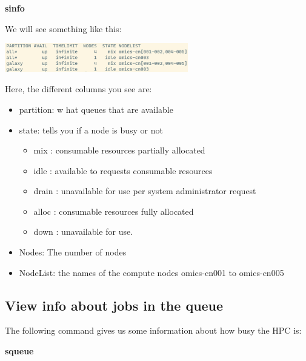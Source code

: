 \documentclass[
  letterpaper,
  DIV=11,
  numbers=noendperiod]{scrreprt}
\newenvironment{Shaded}{}{}
\newcommand{\ExtensionTok}[1]{\textcolor[rgb]{0.84,0.23,0.29}{\textbf{#1}}}
\providecommand{\tightlist}{%
  \setlength{\itemsep}{0pt}\setlength{\parskip}{0pt}}\usepackage{longtable,booktabs,array}
\begin{document}
\begin{Shaded}
\begin{Highlighting}[]
\ExtensionTok{sinfo}
\end{Highlighting}
\end{Shaded}

We will see something like this:

\begin{center}
\includegraphics[width=0.6\textwidth,height=\textheight]{../img/sinfo.png}
\end{center}

Here, the different columns you see are:

\begin{itemize}
\tightlist
\item
  partition: w hat queues that are available
\item
  state: tells you if a node is busy or not

  \begin{itemize}
  \tightlist
  \item
    mix : consumable resources partially allocated
  \item
    idle : available to requests consumable resources
  \item
    drain : unavailable for use per system administrator request
  \item
    alloc : consumable resources fully allocated
  \item
    down : unavailable for use.
  \end{itemize}
\item
  Nodes: The number of nodes
\item
  NodeList: the names of the compute nodes omics-cn001 to omics-cn005
\end{itemize}

\subsection{View info about jobs in the
queue}\label{view-info-about-jobs-in-the-queue}

The following command gives us some information about how busy the HPC
is:

\begin{Shaded}
\begin{Highlighting}[]
\ExtensionTok{squeue}
\end{Highlighting}
\end{Shaded}
\end{document}
